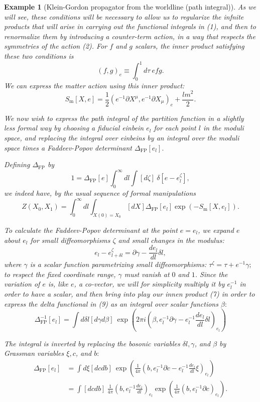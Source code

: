 \documentclass[10pt,
 article,
 amsmath,amssymb
]{revtex4-2}
\newtheorem{example}[theorem]{Example}
\begin{document}
\begin{example}[Klein-Gordon propagator from the worldline (path integral)]
As we will see, these conditions will be necessary to allow us to regularize the infnite 
products that will arise in carrying out the functional integrals in (1), and then to
 renormalize them by introducing a counter-term action, in a way that respects the symmetries
  of the action (2). For $f$ and $g$ scalars, the inner product satisfying these two 
  conditions is
$$(f,g)_e\equiv\int_0^1d\tau\:efg.$$
We can express the matter action using this inner product:
$$S_\mathrm{m}[X,e]=\frac{1}{2}(e^{-1}\partial X^\mu,e^{-1}\partial X_\mu)_e+\frac{lm^2}{2}.$$

We now wish to express the path integral of the partition function in a slightly less 
formal way by choosing a fiducial einbein $e_l$ for each point $l$ in the moduli space,
 and replacing the integral over einbeins by an integral over the moduli space times a 
 Faddeev-Popov determinant $\Delta_\mathrm{FP}[e_l].$ 
 
 Defining $\Delta_\mathrm{FP}$ by
$$1=\Delta_{\mathrm{FP}}[e]\int_0^\infty dl\int[d\zeta]\:\delta[e-e_l^\zeta],$$
we indeed have, by the usual sequence of formal manipulations
$$Z(X_0,X_1)=\int_0^\infty dl\int_{X(0)=X_0}[dX]\Delta_{\mathrm{FP}}[e_l]\exp\left(-S_{\mathrm{m}}[X,e_l]\right).$$

To calculate the Faddeev-Popov determinant at the point $e=e_l$, we expand $e$ about $e_l$ 
for small
diffeomorphisms $\zeta$ and small changes in the modulus:
$$e_l-e_{l+\delta l}^\zeta=\partial\gamma-\frac{de_l}{dl}\delta l,$$
where $\gamma$ is a scalar function parametrizing small diffeomorphisms:
 $\tau^\zeta=\tau+e^{-1}\gamma;$ to respect the fixed coordinate range,
  $\gamma$ must vanish at $0$ and $1$. Since the variation of $e$ is, like $e$, a co-vector,
   we will for simplicity multiply it by $e_l^{-1}$ in order to have a scalar,
    and then bring into play our innen product (7) in order to express the delta 
    functional in (9) as an integral over scalar functions $\beta:$
$$\Delta_{\mathrm{FP}}^{-1}[e_l]=\int d\delta l[d\gamma d\beta]\:\exp\left(2\pi i(\beta,e_l^{-1}\partial\gamma-e_l^{-1}\frac{de_l}{dl}\delta l)_{e_l}\right)$$

The integral is inverted by replacing the bosonic variables $\delta l,\gamma$, and $\beta$ by Grassman variables $\xi,c$,
and $b{:}$
$$\begin{aligned}\Delta_{\mathrm{FP}}[e_{l}]&=\int d\xi[dcdb]\:\exp\left(\frac1{4\pi}(b,e_l^{-1}\partial c-e_l^{-1}\frac{de_l}{dl}\xi)_{e_l}\right)\\&=\int[dcdb]\:\frac1{4\pi}(b,e_l^{-1}\frac{de_l}{dl})_{e_l}\exp\left(\frac1{4\pi}(b,e_l^{-1}\partial c)_{e_l}\right).\end{aligned}$$


\end{example}
\end{document}
